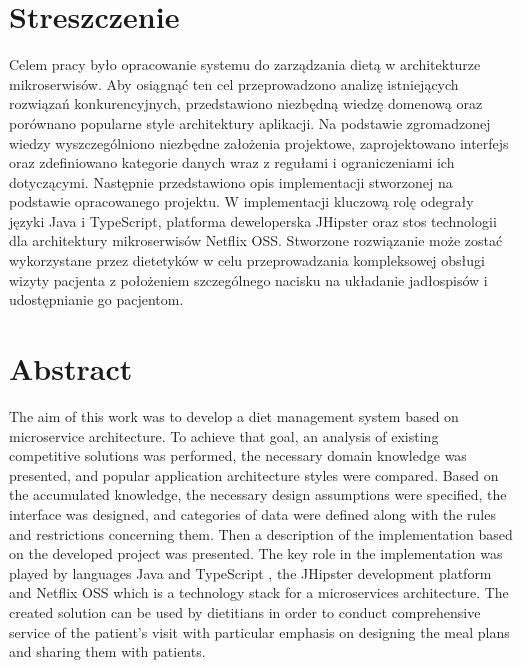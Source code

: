 \chapter*{Streszczenie} %
Celem pracy było opracowanie systemu do zarządzania dietą w architekturze mikroserwisów.
Aby osiągnąć ten cel przeprowadzono analizę istniejących rozwiązań konkurencyjnych, przedstawiono niezbędną wiedzę domenową oraz porównano popularne style architektury aplikacji.
Na podstawie zgromadzonej wiedzy wyszczególniono niezbędne założenia projektowe, zaprojektowano interfejs oraz zdefiniowano kategorie danych wraz z regułami i ograniczeniami ich dotyczącymi.
Następnie przedstawiono opis implementacji stworzonej na podstawie opracowanego projektu.
W implementacji kluczową rolę odegrały języki Java\cite{tech:java} i TypeScript\cite{tech:typescript}, platforma deweloperska JHipster\cite{tech:jhipster} oraz stos technologii dla architektury mikroserwisów Netflix OSS\cite{tech:netflix-oss}.
Stworzone rozwiązanie może zostać wykorzystane przez dietetyków w celu przeprowadzania kompleksowej obsługi wizyty pacjenta z położeniem szczególnego nacisku na układanie jadłospisów i udostępnianie go pacjentom.


\begingroup
\renewcommand{\cleardoublepage}{}
\renewcommand{\clearpage}{}
\chapter*{Abstract} %
The aim of this work was to develop a diet management system based on microservice architecture.
To achieve that goal, an analysis of existing competitive solutions was performed, the necessary domain knowledge was presented, and popular application architecture styles were compared.
Based on the accumulated knowledge, the necessary design assumptions were specified, the interface was designed, and categories of data were defined along with the rules and restrictions concerning them.
Then a description of the implementation based on the developed project was presented.
The key role in the implementation was played by languages Java\cite{tech:java} and TypeScript \cite{tech:typescript}, the JHipster\cite{tech:jhipster} development platform and Netflix OSS\cite{tech:netflix-oss} which is a technology stack for a microservices architecture.
The created solution can be used by dietitians in order to conduct comprehensive service of the patient's visit with particular emphasis on designing the meal plans and sharing them with patients.
\endgroup
{}
